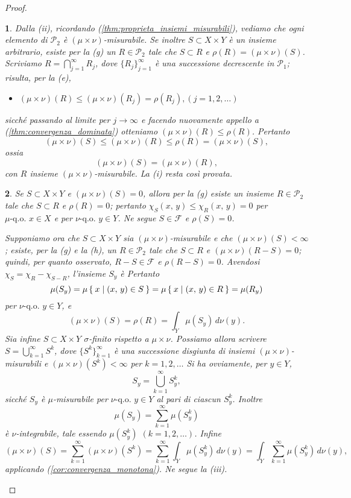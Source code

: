 \documentclass[a4paper,10pt,openright,oneside]{book}
\theoremstyle{theoremstyle}
\theoremstyle{theoremstylewoheader}
\theoremstyle{theoremstyle}
\theoremstyle{proofsecstyle}
\newtheorem{proofsec}{}
\theoremstyle{nonumberplain}
\newtheorem{proof}{Dim.}
\newcommand{\FF}{\ensuremath{\mathcal{F}}}
\newcommand{\PP}{\ensuremath{\mathcal{P}}}
\newcommand{\qogni}[2]{\ensuremath{#2\text{-q.o. $\!#1$}}}
\newcommand{\mymath}[2]{\begin{itemize}%
  \item[]\hfill\hbox{}\ensuremath{\displaystyle #1}\hfill\ensuremath{\displaystyle #2}%
  \end{itemize}}
\begin{document}
\begin{proof}
\begin{proofsec}
Dalla (ii), ricordando (\ref{thm:proprieta_insiemi_misurabili}), vediamo che ogni elemento di $\PP_2$ è $(\mu\times\nu)$-misurabile. Se inoltre $S \subset X \times Y$ è un insieme arbitrario, esiste per la (g) un $R \in \PP_2$ tale che $S \subset R$ e $\rho(R) = (\mu\times\nu)(S)$. Scriviamo $R = \bigcap_{j=1}^\infty R_j$, dove $\{R_j\}_{j=1}^\infty$ è una successione decrescente in $\PP_1$; risulta, per la (e), \mymath{(\mu\times\nu)(R) \le (\mu\times\nu)(R_j) = \rho(R_j),}{(j = 1, 2, \ldots)} sicché passando al limite per $j \to \infty$ e facendo nuovamente appello a (\ref{thm:convergenza_dominata}) otteniamo $(\mu\times\nu)(R) \le \rho(R)$. Pertanto
\[
(\mu\times\nu)(S) \le (\mu\times\nu)(R) \le \rho(R) = (\mu\times\nu)(S),
\]
ossia
\[
(\mu\times\nu)(S) = (\mu\times\nu)(R),
\]
con $R$ insieme $(\mu\times\nu)$-misurabile. La (i) resta così provata.
\end{proofsec}

\begin{proofsec}
Se $S \subset X \times Y$ e $(\mu\times\nu)(S) = 0$, allora per la (g) esiste un insieme $R \in \PP_2$ tale che $S \subset R$ e $\rho(R) = 0$; pertanto $\chi_S(x,\, y) \le \chi_R(x,\, y) = 0$ per $\qogni{x \in X}{\mu}$ e per $\qogni{y \in Y}{\nu}$. Ne segue $S \in \FF$ e $\rho(S) = 0$.

Supponiamo ora che $S \subset X \times Y$ sia $(\mu\times\nu)$-misurabile e che $(\mu\times\nu)(S) < \infty$; esiste, per la (g) e la (h), un $R \in \PP_2$ tale che $S \subset R$ e $(\mu\times\nu)(R - S) = 0$; quindi, per quanto osservato, $R - S \in \FF$ e $\rho(R - S) = 0$. Avendosi $\chi_S = \chi_R - \chi_{S - R}$, l'insieme $S_y$ è 
Pertanto
\[
\mu(S_y) = \mu\Set{ x | (x,\, y) \in S } = \mu\Set{ x | (x,\, y) \in R } = \mu(R_y)
\]
per $\qogni{y \in Y}{\nu}$, e
\[
(\mu\times\nu)(S) = \rho(R) = \int_Y \mu(S_y)\, d\nu(y).
\]
Sia infine $S \subset X \times Y$ $\sigma$-finito rispetto a $\mu\times\nu$. Possiamo allora scrivere $S = \bigcup_{k=1}^\infty S^k$, dove $\{S^k\}_{k=1}^\infty$ è una successione \emph{disgiunta} di insiemi $(\mu\times\nu)$-misurabili e $(\mu\times\nu)(S^k) < \infty$ per $k = 1, 2, \ldots$ Si ha ovviamente, per $y \in Y$,
\[
S_y = \bigcup_{k=1}^\infty S_y^k,
\]
sicché $S_y$ è $\mu$-misurabile per $\qogni{y \in Y}{\nu}$ al pari di ciascun $S_y^k$. Inoltre
\[
\mu(S_y) = \sum_{k=1}^\infty \mu(S_y^k)
\]
è $\nu$-integrabile, tale essendo $\mu(S_y^k)$ $(k = 1, 2, \ldots)$. Infine
\[
(\mu\times\nu)(S) = \sum_{k=1}^\infty (\mu\times\nu)(S^k) = \sum_{k=1}^\infty \int_Y \mu(S_y^k)\, d\nu(y) = \int_Y \sum_{k=1}^\infty \mu(S_y^k)\, d\nu(y),
\]
applicando (\ref{cor:convergenza_monotona}). Ne segue la (iii).
\end{proofsec}


\end{proof}
\end{document}
